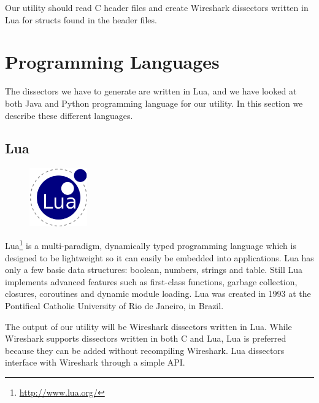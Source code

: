 Our utility should read C header files and create Wireshark dissectors written
in Lua for structs found in the header files.


\section{Programming Languages}
\label{sec:pre:langs}
The dissectors we have to generate are written in Lua, and we have looked at
both Java and Python programming language for our utility. In this section we
describe these different languages.

\subsection{Lua}
\begin{figure}
	\begin{center}
	\vspace{-30pt}
		\includegraphics[width=2.5cm]{./planning/img/lua_logo}
	\vspace{-30pt}
	\end{center}
\end{figure}
Lua\footnote{\url{http://www.lua.org/}} is a multi-paradigm, dynamically typed
programming language which is designed to be lightweight so it can easily be
embedded into applications. Lua has only a few basic data structures: boolean,
numbers, strings and table. Still Lua implements advanced features such as
first-class functions, garbage collection, closures, coroutines and dynamic
module loading. Lua was created in 1993 at the Pontifical Catholic University
of Rio de Janeiro, in Brazil.

The output of our utility will be Wireshark dissectors written in Lua. While
Wireshark supports dissectors written in both C and Lua, Lua is preferred
because they can be added without recompiling Wireshark. Lua dissectors
interface with Wireshark through a simple API.

